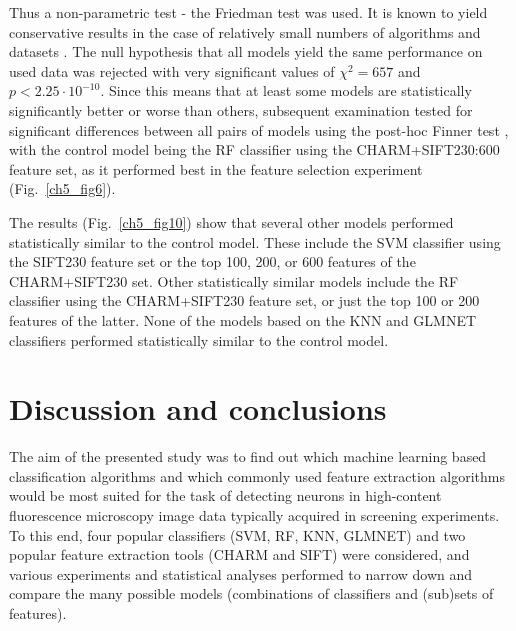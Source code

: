 Thus a non-parametric test - the Friedman test \cite{friedman1940comparison} was used. It is known to yield conservative results in the case of relatively small numbers of algorithms and datasets \cite{garcia2010advanced}. The null hypothesis that all models yield the same performance on used data was rejected with very significant values of $\chi^2 = 657$ and $p < 2.25 \cdot 10^{-10}$. Since this means that at least some models are statistically significantly better or worse than others, subsequent examination tested for significant differences between all pairs of models using the post-hoc Finner test \cite{finner1993monotonicity}, with the control model being the RF classifier using the CHARM+SIFT230:600 feature set, as it performed best in the feature selection experiment (Fig.~\ref{ch5_fig6}).

The results (Fig.~\ref{ch5_fig10}) show that several other models performed statistically similar to the control model. These include the SVM classifier using the SIFT230 feature set or the top 100, 200, or 600 features of the CHARM+SIFT230 set. Other statistically similar models include the RF classifier using the CHARM+SIFT230 feature set, or just the top 100 or 200 features of the latter. None of the models based on the KNN and GLMNET classifiers performed statistically similar to the control model.

\section{Discussion and conclusions}
\label{sec:discussion}
The aim of the presented study was to find out which machine learning based classification algorithms and which commonly used feature extraction algorithms would be most suited for the task of detecting neurons in high-content fluorescence microscopy image data typically acquired in screening experiments. To this end, four popular classifiers (SVM, RF, KNN, GLMNET) and two popular feature extraction tools (CHARM and SIFT) were considered, and various experiments and statistical analyses performed to narrow down and compare the many possible models (combinations of classifiers and (sub)sets of features).

